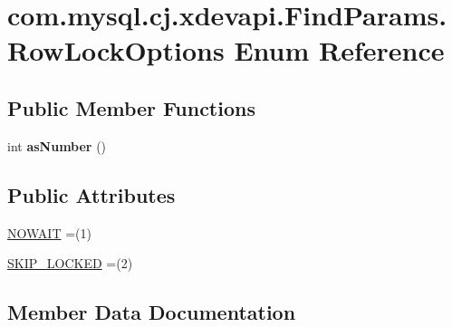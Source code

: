 \hypertarget{enumcom_1_1mysql_1_1cj_1_1xdevapi_1_1_find_params_1_1_row_lock_options}{}\section{com.\+mysql.\+cj.\+xdevapi.\+Find\+Params.\+Row\+Lock\+Options Enum Reference}
\label{enumcom_1_1mysql_1_1cj_1_1xdevapi_1_1_find_params_1_1_row_lock_options}
\subsection*{Public Member Functions}
\begin{DoxyCompactItemize}
\item 
\mbox{\label{enumcom_1_1mysql_1_1cj_1_1xdevapi_1_1_find_params_1_1_row_lock_options_a6fc3474051ae4def5ad719541a78d519}} 
int {\bfseries as\+Number} ()
\end{DoxyCompactItemize}
\subsection*{Public Attributes}
\begin{DoxyCompactItemize}
\item 
\mbox{\hyperlink{enumcom_1_1mysql_1_1cj_1_1xdevapi_1_1_find_params_1_1_row_lock_options_a2652b9f0cf6fc16491dd4539320f7333}{N\+O\+W\+A\+IT}} =(1)
\item 
\mbox{\hyperlink{enumcom_1_1mysql_1_1cj_1_1xdevapi_1_1_find_params_1_1_row_lock_options_ae0b500686e79e2bd8cfa2b94e2bf557e}{S\+K\+I\+P\+\_\+\+L\+O\+C\+K\+ED}} =(2)
\end{DoxyCompactItemize}


\subsection{Member Data Documentation}
\mbox{\label{enumcom_1_1mysql_1_1cj_1_1xdevapi_1_1_find_params_1_1_row_lock_options_a2652b9f0cf6fc16491dd4539320f7333}} 
